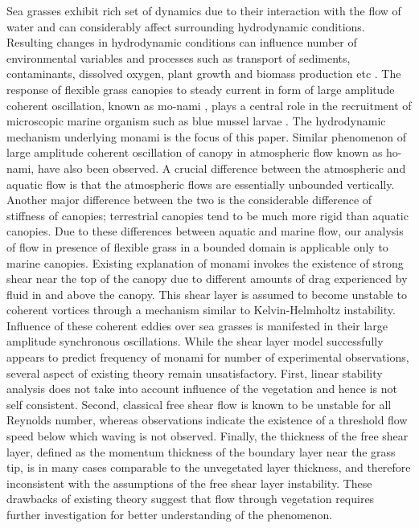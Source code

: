 \documentclass[aps,prl,twocolumn,showpacs,superscriptaddress,groupedaddress,10pt]{revtex4-1}  %
\begin{document}
Sea grasses exhibit rich set of dynamics due to their interaction with the flow of water and can considerably affect surrounding hydrodynamic conditions.
Resulting changes in hydrodynamic conditions can influence number of environmental variables and processes such as 
transport of sediments, contaminants, dissolved oxygen, plant growth and biomass production etc \cite{Fonseca87,Nepf99}. 
The response of flexible grass canopies to steady current in form of large amplitude coherent oscillation, known as mo-nami \cite{AckermanOkubo93}, plays a central role
in the recruitment of microscopic marine organism such as blue mussel larvae \cite{Grizzle96}. The hydrodynamic mechanism underlying monami is the focus of this paper. 
\newline
Similar phenomenon of large amplitude coherent oscillation of canopy in atmospheric flow known as ho-nami\cite{Inoue56,Raupach96}, have also been observed.
A crucial difference between the atmospheric and aquatic flow is that the atmospheric flows are essentially unbounded vertically\cite{Vivoni98,Nepf00}. Another major
difference between the two is the considerable difference of stiffness of canopies; terrestrial canopies tend to be much more rigid than aquatic canopies\cite{Vivoni98,Ghisal02}.
Due to these differences between aquatic and marine flow, our analysis of flow in presence of flexible grass in a bounded domain is applicable only to marine canopies. 
\newline   
Existing explanation of monami invokes the existence of strong shear near the top of the canopy \cite{Ghisal02,Raupach96} due to
different amounts of drag experienced by fluid in and above the canopy. This shear layer is assumed to become unstable to coherent vortices through a mechanism similar to 
Kelvin-Helmholtz instability. Influence of these coherent eddies over sea grasses is manifested in their large amplitude synchronous oscillations.
\newline
While the shear layer model successfully appears to predict frequency of monami for number of experimental observations, several aspect of existing theory remain unsatisfactory. 
First, linear stability analysis\cite{Raupach96} does not take into account influence of the vegetation and hence is not self consistent. Second, classical free shear flow 
is known to be unstable for all Reynolds number\cite{drazin}, whereas observations\cite{Grizzle96} indicate the existence of a threshold flow speed below which waving is not observed. 
Finally, the thickness of the free shear layer, defined as the momentum thickness of the boundary layer near the grass tip, is in many cases comparable to the unvegetated layer thickness,
 and therefore inconsistent with the assumptions of the free shear layer instability. These drawbacks of existing theory suggest that flow through vegetation requires further investigation for better understanding of the phenomenon.
\end{document}

